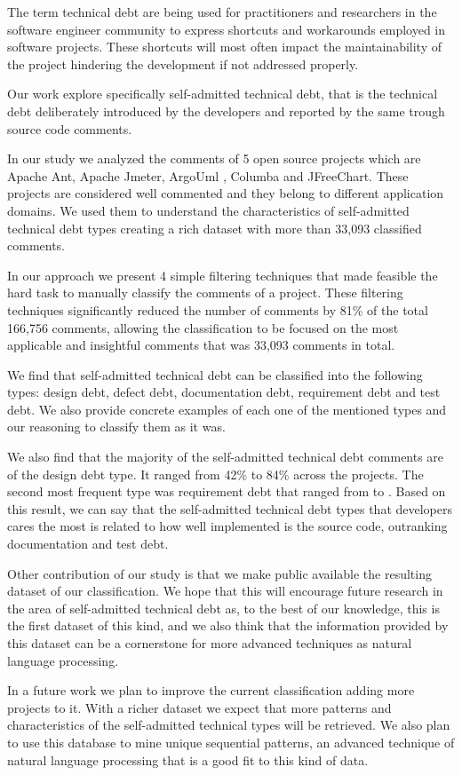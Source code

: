 The term technical debt are being used for practitioners and researchers in the software engineer community to express shortcuts and workarounds employed in software projects. These shortcuts will most often impact the maintainability of the project hindering the development if not addressed properly.

Our work explore specifically self-admitted technical debt, that is the technical debt deliberately introduced by the developers and reported by the same trough source code comments.

In our study we analyzed the comments of 5 open source projects which are Apache Ant, Apache Jmeter, ArgoUml , Columba and JFreeChart. These projects are considered well commented and they belong to different application domains. We used them to understand the characteristics of self-admitted technical debt types creating a rich dataset with more than 33,093 classified comments.

In our approach we present 4 simple filtering techniques that made feasible the hard task to manually classify the comments of a project. These filtering techniques significantly reduced the number of comments by 81\% of the total 166,756 comments, allowing the classification to be focused on the most applicable and insightful comments that was 33,093 comments in total. 

We find that self-admitted technical debt can be classified into the following types: design debt, defect debt, documentation debt, requirement debt and test debt. We also provide concrete examples of each one of the mentioned types and our reasoning to classify them as it was.  

We also find that the majority of the self-admitted technical debt comments are of the design debt type. It ranged from 42\% to 84\% across the projects. The second most frequent type was requirement debt that ranged from  to . Based on this result, we can say that the self-admitted technical debt types that developers cares the most is related to how well implemented is the source code, outranking documentation and test debt.

Other contribution of our study is that we make public available the resulting dataset of our classification. We hope that this will encourage future research in the area of self-admitted technical debt as, to the best of our knowledge, this is the first dataset of this kind, and we also think that the information provided by this dataset can be a cornerstone for more advanced techniques as natural language processing.   

In a future work we plan to improve the current classification adding more projects to it. With a richer dataset we expect that more patterns and characteristics of the self-admitted technical types will be retrieved. We also plan to use this database to mine unique sequential patterns, an advanced technique of natural language processing that is a good fit to this kind of data. 
